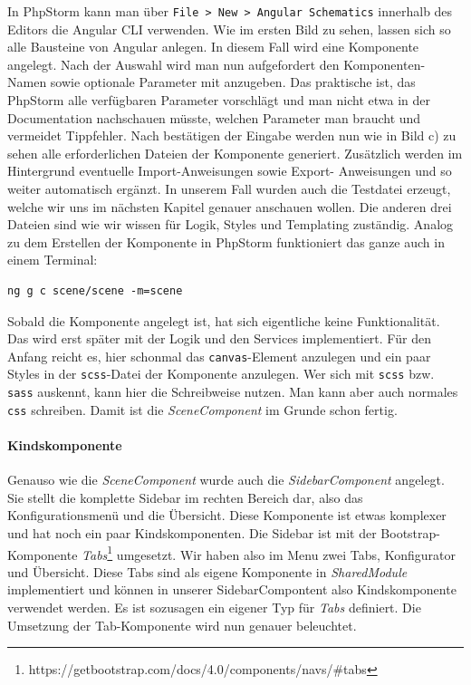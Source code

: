 %
In PhpStorm kann man über \lstinline{File > New > Angular Schematics} innerhalb des Editors die Angular CLI verwenden. Wie im ersten Bild zu sehen, lassen sich so alle Bausteine von Angular anlegen. In diesem Fall wird eine Komponente angelegt. Nach der Auswahl wird man nun aufgefordert den Komponenten-Namen sowie optionale Parameter mit anzugeben. Das praktische ist, das PhpStorm alle verfügbaren Parameter vorschlägt und man nicht etwa in der Documentation nachschauen müsste, welchen Parameter man braucht und vermeidet Tippfehler. Nach bestätigen der Eingabe werden nun wie in Bild c) zu sehen alle erforderlichen Dateien der Komponente generiert. Zusätzlich werden im Hintergrund eventuelle Import-Anweisungen sowie Export- Anweisungen und so weiter automatisch ergänzt. In unserem Fall wurden auch die Testdatei erzeugt, welche wir uns im nächsten Kapitel genauer anschauen wollen. Die anderen drei Dateien sind wie wir wissen für Logik, Styles und Templating zuständig. Analog zu dem Erstellen der Komponente in PhpStorm funktioniert das ganze auch in einem Terminal:
%
\begin{lstlisting}
ng g c scene/scene -m=scene
\end{lstlisting}
%
Sobald die Komponente angelegt ist, hat sich eigentliche keine Funktionalität. Das wird erst später mit der Logik und den Services implementiert. Für den Anfang reicht es, hier schonmal das \texttt{canvas}-Element anzulegen und ein paar Styles in der \texttt{scss}-Datei der Komponente anzulegen. Wer sich mit \texttt{scss} bzw. \texttt{sass} auskennt, kann hier die Schreibweise nutzen. Man kann aber auch normales \texttt{css} schreiben. Damit ist die \textit{SceneComponent} im Grunde schon fertig.
\paragraph{Kindskomponente}
Genauso wie die \textit{SceneComponent} wurde auch die \textit{SidebarComponent} angelegt. Sie stellt die komplette Sidebar im rechten Bereich dar, also das Konfigurationsmenü und die Übersicht. Diese Komponente ist etwas komplexer und hat noch ein paar Kindskomponenten. Die Sidebar ist mit der Bootstrap-Komponente \textit{Tabs}\footnote{https://getbootstrap.com/docs/4.0/components/navs/\#tabs} umgesetzt. Wir haben also im Menu zwei Tabs, Konfigurator und Übersicht. Diese Tabs sind als eigene Komponente in \textit{SharedModule} implementiert und können in unserer SidebarCompontent also Kindskomponente verwendet werden. Es ist sozusagen ein eigener Typ für \textit{Tabs} definiert. Die Umsetzung der Tab-Komponente wird nun genauer beleuchtet.\\

